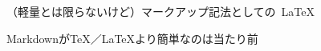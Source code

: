 \documentclass[14pt,dvipdfmx,uplatex]{beamer}
\begin{document}
{%
\begin{frame}[t]{\leavevmode\inhibitglue （軽量とは限らないけど）\newline マークアップ記法としての\ \LaTeX }
  \sffamily
  \begin{center}
  \end{center}
\end{frame}
}

{%
\begin{frame}[t]{\inhibitglue Markdownが\TeX／\LaTeX より簡単なのは当たり前}
  \sffamily
  \begin{center}
  \end{center}
\end{frame}
}
\end{document}
